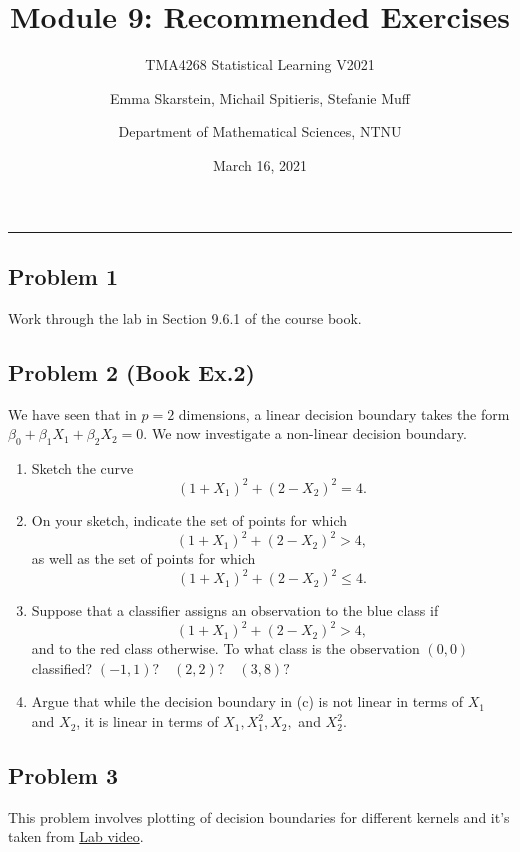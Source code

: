 \documentclass[]{article}
\title{Module 9: Recommended Exercises}
\subtitle{TMA4268 Statistical Learning V2021}
\author{Emma Skarstein, Michail Spitieris, Stefanie Muff \and Department of Mathematical Sciences, NTNU}
\date{March 16, 2021}
\begin{document}
\maketitle

\begin{center}\rule{0.5\linewidth}{0.5pt}\end{center}

\hypertarget{problem-1}{%
\subsection{Problem 1}\label{problem-1}}

Work through the lab in Section 9.6.1 of the course book.

\hypertarget{problem-2-book-ex.2}{%
\subsection{Problem 2 (Book Ex.2)}\label{problem-2-book-ex.2}}

We have seen that in \(p = 2\) dimensions, a linear decision boundary
takes the form \(\beta_0 +\beta_1 X_1 + \beta_2 X_2 = 0\). We now
investigate a non-linear decision boundary.

\begin{enumerate}
\def\labelenumi{\alph{enumi})}
\item
  Sketch the curve \[(1 + X_1)^2 + (2 - X_2)^2 = 4.\]
\item
  On your sketch, indicate the set of points for which
  \[(1+X_1)^2 +(2-X_2)^2 >4,\] as well as the set of points for which
  \[(1+X_1)^2 +(2-X_2)^2 \leq 4.\]
\item
  Suppose that a classifier assigns an observation to the blue class if
  \[(1+X_1)^2 +(2-X_2)^2 >4,\] and to the red class otherwise. To what
  class is the observation \((0, 0)\) classified?
  \((-1,1)?\quad (2,2)? \quad (3,8)?\)
\item
  Argue that while the decision boundary in (c) is not linear in terms
  of \(X_1\) and \(X_2\), it is linear in terms of \(X_1, X_1^2, X_2,\)
  and \(X_2^2.\)
\end{enumerate}

\hypertarget{problem-3}{%
\subsection{Problem 3}\label{problem-3}}

This problem involves plotting of decision boundaries for different
kernels and it's taken from
\href{https://www.youtube.com/watch?v=qhyyufR0930\&list=PL5-da3qGB5IDl6MkmovVdZwyYOhpCxo5o\&index=5}{Lab
video}.
\end{document}
